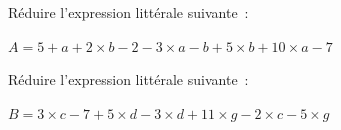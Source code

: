 \documentclass[activite]{thedocument}
\begin{document}
    Réduire l'expression littérale suivante~:\par\kern10pt\noindent
    $A=5+a+2\times b-2-3\times a-b+5\times b+10\times a-7$\par\kern200pt
    Réduire l'expression littérale suivante~:\par\kern10pt\noindent
    $B=3\times c-7+5\times d-3\times d+11\times g-2\times c-5\times g$
\end{document}

